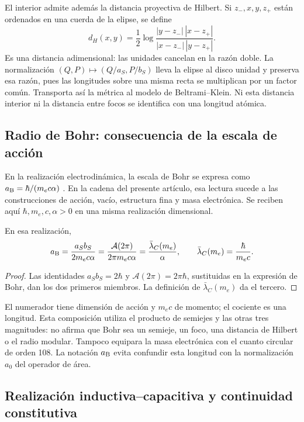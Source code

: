El interior admite además la distancia proyectiva de Hilbert. Si
\(z_-,x,y,z_+\) están ordenados en una cuerda de la elipse, se define
\[
 d_H(x,y)=\frac12\log
 \frac{|y-z_-|\,|x-z_+|}{|x-z_-|\,|y-z_+|}.
\]
Es una distancia adimensional: las unidades cancelan en la razón doble.
La normalización \((Q,P)\mapsto(Q/a_S,P/b_S)\) lleva la elipse
al disco unidad y preserva esa razón, pues las longitudes sobre una
misma recta se multiplican por un factor común. Transporta así la métrica
al modelo de Beltrami--Klein. Ni esta distancia interior ni la distancia
entre focos se identifica con una longitud atómica.

\subsection{Radio de Bohr: consecuencia de la escala de acción}
\label{sec:ii-elipse-bohr}

En la realización electrodinámica, la escala de Bohr se expresa como
\(a_{\rm B}=\hbar/(m_ec\alpha)\) \cite{codata2022}. En la cadena
del presente artículo, esa lectura sucede a las construcciones de
acción, vacío, estructura fina y masa electrónica. Se reciben aquí
\(\hbar,m_e,c,\alpha>0\) en una misma realización dimensional.
\begin{proposition}
\label{prop:ii-elipse-bohr}
En esa realización,
\begin{equation}
 a_{\rm B}=\frac{a_Sb_S}{2m_ec\alpha}
 =\frac{\mathcal A(2\pi)}{2\pi m_ec\alpha}
 =\frac{\bar\lambda_C(m_e)}{\alpha},\qquad
 \bar\lambda_C(m_e)=\frac{\hbar}{m_ec}.
 \label{eq:ii-elipse-bohr}
\end{equation}
\end{proposition}
\begin{proof}
Las identidades \(a_Sb_S=2\hbar\) y
\(\mathcal A(2\pi)=2\pi\hbar\), sustituidas en la expresión
de Bohr, dan los dos primeros miembros. La definición de
\(\bar\lambda_C(m_e)\) da el tercero.
\end{proof}

El numerador tiene dimensión de acción y \(m_ec\) de momento; el
cociente es una longitud. Esta composición utiliza el producto de
semiejes y las otras tres magnitudes: no afirma que Bohr sea un semieje,
un foco, una distancia de Hilbert o el radio modular. Tampoco equipara
la masa electrónica con el cuanto circular de orden 108. La notación
\(a_{\rm B}\) evita confundir esta longitud con la normalización
\(a_0\) del operador de área.

\subsection{Realización inductiva--capacitiva y continuidad constitutiva}
\label{sec:ii-elipse-lc}

